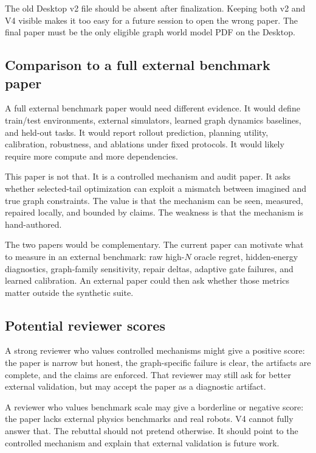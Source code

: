 \documentclass{article}
\begin{document}
The old Desktop v2 file should be absent after finalization.  Keeping both v2
and V4 visible makes it too easy for a future session to open the wrong paper.
The final paper must be the only eligible graph world model PDF on the Desktop.

\subsection{Comparison to a full external benchmark paper}

A full external benchmark paper would need different evidence.  It would define
train/test environments, external simulators, learned graph dynamics baselines,
and held-out tasks.  It would report rollout prediction, planning utility,
calibration, robustness, and ablations under fixed protocols.  It would likely
require more compute and more dependencies.

This paper is not that.  It is a controlled mechanism and audit paper.  It asks
whether selected-tail optimization can exploit a mismatch between imagined and
true graph constraints.  The value is that the mechanism can be seen, measured,
repaired locally, and bounded by claims.  The weakness is that the mechanism is
hand-authored.

The two papers would be complementary.  The current paper can motivate what to
measure in an external benchmark: raw high-\(N\) oracle regret, hidden-energy
diagnostics, graph-family sensitivity, repair deltas, adaptive gate failures,
and learned calibration.  An external paper could then ask whether those metrics
matter outside the synthetic suite.

\subsection{Potential reviewer scores}

A strong reviewer who values controlled mechanisms might give a positive score:
the paper is narrow but honest, the graph-specific failure is clear, the
artifacts are complete, and the claims are enforced.  That reviewer may still
ask for better external validation, but may accept the paper as a diagnostic
artifact.

A reviewer who values benchmark scale may give a borderline or negative score:
the paper lacks external physics benchmarks and real robots.  V4 cannot fully
answer that.  The rebuttal should not pretend otherwise.  It should point to
the controlled mechanism and explain that external validation is future work.
\end{document}
